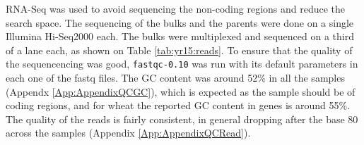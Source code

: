 RNA-Seq was used to avoid sequencing the non-coding regions and reduce the search space.  
The sequencing of the bulks and the parents were done on a single Illumina Hi-Seq2000 each.
The bulks were multiplexed and sequenced on a third of a lane each, as shown on Table \ref{tab:yr15:reads}. 
To ensure that the quality of the sequencencing was good, \verb|fastqc-0.10| \citep{fastqc}  was run with its default parameters in each one of the fastq files.  
The GC content was around 52\% in all the samples (Appendx \ref{App:AppendixQCGC}), which is expected as the sample should be of coding regions, and for wheat the reported GC content in genes is around 55\%.  
The quality of the reads is fairly consistent, in general dropping after the base 80 across the samples (Appendix \ref{App:AppendixQCRead}). 




